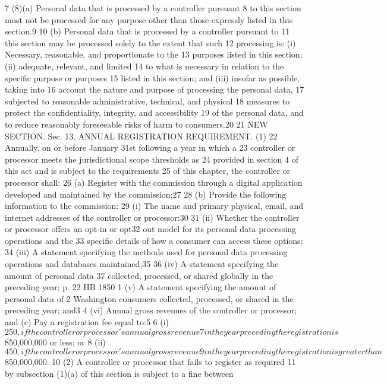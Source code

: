 7 (8)(a) Personal data that is processed by a controller pursuant
8 to this section must not be processed for any purpose other than
those expressly listed in this section.9
10 (b) Personal data that is processed by a controller pursuant to
11 this section may be processed solely to the extent that such
12 processing is: (i) Necessary, reasonable, and proportionate to the
13 purposes listed in this section; (ii) adequate, relevant, and limited
14 to what is necessary in relation to the specific purpose or purposes
15 listed in this section; and (iii) insofar as possible, taking into
16 account the nature and purpose of processing the personal data,
17 subjected to reasonable administrative, technical, and physical
18 measures to protect the confidentiality, integrity, and accessibility
19 of the personal data, and to reduce reasonably foreseeable risks of
harm to consumers.20
21 NEW SECTION. Sec. 13. ANNUAL REGISTRATION REQUIREMENT. (1)
22 Annually, on or before January 31st following a year in which a
23 controller or processor meets the jurisdictional scope thresholds as
24 provided in section 4 of this act and is subject to the requirements
25 of this chapter, the controller or processor shall:
26 (a) Register with the commission through a digital application
developed and maintained by the commission;27
28 (b) Provide the following information to the commission:
29 (i) The name and primary physical, email, and internet addresses
of the controller or processor;30
31 (ii) Whether the controller or processor offers an opt-in or opt32 out model for its personal data processing operations and the
33 specific details of how a consumer can access these options;
34 (iii) A statement specifying the methods used for personal data
processing operations and databases maintained;35
36 (iv) A statement specifying the amount of personal data
37 collected, processed, or shared globally in the preceding year;
p. 22 HB 1850
1 (v) A statement specifying the amount of personal data of
2 Washington consumers collected, processed, or shared in the preceding
year; and3
4 (vi) Annual gross revenues of the controller or processor; and
(c) Pay a registration fee equal to:5
6 (i) $250, if the controller or processor's annual gross revenue
7 in the year preceding the registration is $850,000,000 or less; or
8 (ii) $450, if the controller or processor's annual gross revenue
9 in the year preceding the registration is greater than $850,000,000.
10 (2) A controller or processor that fails to register as required
11 by subsection (1)(a) of this section is subject to a fine between
